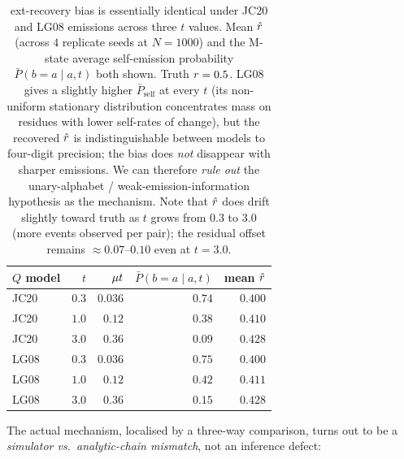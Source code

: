 \begin{table}[ht]
\centering\small
\begin{tabular}{lrrrr}
\toprule
$Q$ model & $t$ & $\mu t$ & $\bar P(b\!=\!a \mid a, t)$ & mean $\hat{r}$ \\
\midrule
JC20 & $0.3$ & $0.036$ & $0.74$ & $0.400$ \\
JC20 & $1.0$ & $0.12$  & $0.38$ & $0.410$ \\
JC20 & $3.0$ & $0.36$  & $0.09$ & $0.428$ \\
LG08 & $0.3$ & $0.036$ & $0.75$ & $0.400$ \\
LG08 & $1.0$ & $0.12$  & $0.42$ & $0.411$ \\
LG08 & $3.0$ & $0.36$  & $0.15$ & $0.428$ \\
\bottomrule
\end{tabular}
\caption{ext-recovery bias is essentially identical under JC20
and LG08 emissions across three $t$ values.  Mean $\hat{r}$
(across $4$ replicate seeds at $N = 1000$) and the M-state
average self-emission probability $\bar P(b = a \mid a, t)$ both
shown.  Truth $r = 0.5$.  LG08 gives a slightly higher
$\bar P_{\text{self}}$ at every $t$ (its non-uniform stationary
distribution concentrates mass on residues with lower self-rates
of change), but the recovered $\hat{r}$ is indistinguishable
between models to four-digit precision; the bias does
\emph{not} disappear with sharper emissions.  We can therefore
\emph{rule out} the unary-alphabet / weak-emission-information
hypothesis as the mechanism.  Note that $\hat{r}$ does drift
slightly toward truth as $t$ grows from $0.3$ to $3.0$
(more events observed per pair); the residual offset remains
$\approx 0.07$--$0.10$ even at $t = 3.0$.}
\label{tab:ext-recovery-vs-subst-model}
\end{table}

The actual mechanism, localised by a three-way comparison, turns out
to be a \emph{simulator vs.\ analytic-chain mismatch}, not an
inference defect:

